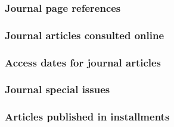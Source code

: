 \documentclass[11pt,letterpaper,oneside]{article}
\begin{document}
\begin{citebib}
\item \cite{authora}
\end{citebib}

\setcounter{subsubsection}{173}
\subsubsection{Journal page references}

\begin{citebib}
\item \cite{gold2015}
\item \cite[2--3]{paudyal2015}
\end{citebib}

\subsubsection{Journal articles consulted online}

\begin{citebib}
\item \cite[268]{whitney1929}
\item \cite[260--61]{schoenfield2016}
\end{citebib}

\subsubsection{Access dates for journal articles}

\begin{citebib}
\item \cite[81]{narr2015}
\item \cite[88--89]{narr2015}
\end{citebib}

\setcounter{subsubsection}{177}
\subsubsection{Journal special issues}

\begin{citebib}
\item \cite[351--81]{tezuka2013}
\end{citebib}

\setcounter{subsubsection}{179}
\subsubsection{Articles published in installments}
\end{document}
